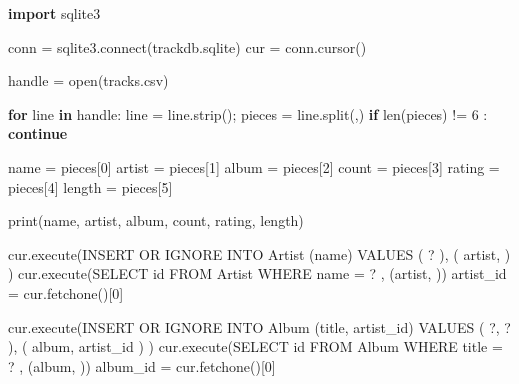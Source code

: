 \documentclass[10pt,]{book}
\newenvironment{Shaded}{}{}
\newcommand{\BuiltInTok}[1]{\textcolor[rgb]{0.00,0.50,0.00}{#1}}
\newcommand{\ControlFlowTok}[1]{\textcolor[rgb]{0.00,0.44,0.13}{\textbf{#1}}}
\newcommand{\DecValTok}[1]{\textcolor[rgb]{0.25,0.63,0.44}{#1}}
\newcommand{\ExtensionTok}[1]{#1}
\newcommand{\ImportTok}[1]{\textcolor[rgb]{0.00,0.50,0.00}{\textbf{#1}}}
\newcommand{\KeywordTok}[1]{\textcolor[rgb]{0.00,0.44,0.13}{\textbf{#1}}}
\newcommand{\NormalTok}[1]{#1}
\newcommand{\OperatorTok}[1]{\textcolor[rgb]{0.40,0.40,0.40}{#1}}
\newcommand{\StringTok}[1]{\textcolor[rgb]{0.25,0.44,0.63}{#1}}
\begin{document}
\begin{Shaded}
\begin{Highlighting}[]
\ImportTok{import}\NormalTok{ sqlite3}

\NormalTok{conn }\OperatorTok{=}\NormalTok{ sqlite3.}\ExtensionTok{connect}\NormalTok{(}\StringTok{\textquotesingle{}trackdb.sqlite\textquotesingle{}}\NormalTok{)}
\NormalTok{cur }\OperatorTok{=}\NormalTok{ conn.cursor()}

\NormalTok{handle }\OperatorTok{=} \BuiltInTok{open}\NormalTok{(}\StringTok{\textquotesingle{}tracks.csv\textquotesingle{}}\NormalTok{)}

\ControlFlowTok{for}\NormalTok{ line }\KeywordTok{in}\NormalTok{ handle:}
\NormalTok{    line }\OperatorTok{=}\NormalTok{ line.strip()}\OperatorTok{;}
\NormalTok{    pieces }\OperatorTok{=}\NormalTok{ line.split(}\StringTok{\textquotesingle{},\textquotesingle{}}\NormalTok{)}
    \ControlFlowTok{if} \BuiltInTok{len}\NormalTok{(pieces) }\OperatorTok{!=} \DecValTok{6}\NormalTok{ : }\ControlFlowTok{continue}

\NormalTok{    name }\OperatorTok{=}\NormalTok{ pieces[}\DecValTok{0}\NormalTok{]}
\NormalTok{    artist }\OperatorTok{=}\NormalTok{ pieces[}\DecValTok{1}\NormalTok{]}
\NormalTok{    album }\OperatorTok{=}\NormalTok{ pieces[}\DecValTok{2}\NormalTok{]}
\NormalTok{    count }\OperatorTok{=}\NormalTok{ pieces[}\DecValTok{3}\NormalTok{]}
\NormalTok{    rating }\OperatorTok{=}\NormalTok{ pieces[}\DecValTok{4}\NormalTok{]}
\NormalTok{    length }\OperatorTok{=}\NormalTok{ pieces[}\DecValTok{5}\NormalTok{]}

    \BuiltInTok{print}\NormalTok{(name, artist, album, count, rating, length)}

\NormalTok{    cur.execute(}\StringTok{\textquotesingle{}\textquotesingle{}\textquotesingle{}INSERT OR IGNORE INTO Artist (name)}
\StringTok{        VALUES ( ? )\textquotesingle{}\textquotesingle{}\textquotesingle{}}\NormalTok{, ( artist, ) )}
\NormalTok{    cur.execute(}\StringTok{\textquotesingle{}SELECT id FROM Artist WHERE name = ? \textquotesingle{}}\NormalTok{, (artist, ))}
\NormalTok{    artist\_id }\OperatorTok{=}\NormalTok{ cur.fetchone()[}\DecValTok{0}\NormalTok{]}

\NormalTok{    cur.execute(}\StringTok{\textquotesingle{}\textquotesingle{}\textquotesingle{}INSERT OR IGNORE INTO Album (title, artist\_id)}
\StringTok{        VALUES ( ?, ? )\textquotesingle{}\textquotesingle{}\textquotesingle{}}\NormalTok{, ( album, artist\_id ) )}
\NormalTok{    cur.execute(}\StringTok{\textquotesingle{}SELECT id FROM Album WHERE title = ? \textquotesingle{}}\NormalTok{, (album, ))}
\NormalTok{    album\_id }\OperatorTok{=}\NormalTok{ cur.fetchone()[}\DecValTok{0}\NormalTok{]}


\end{Highlighting}
\end{Shaded}
\end{document}
